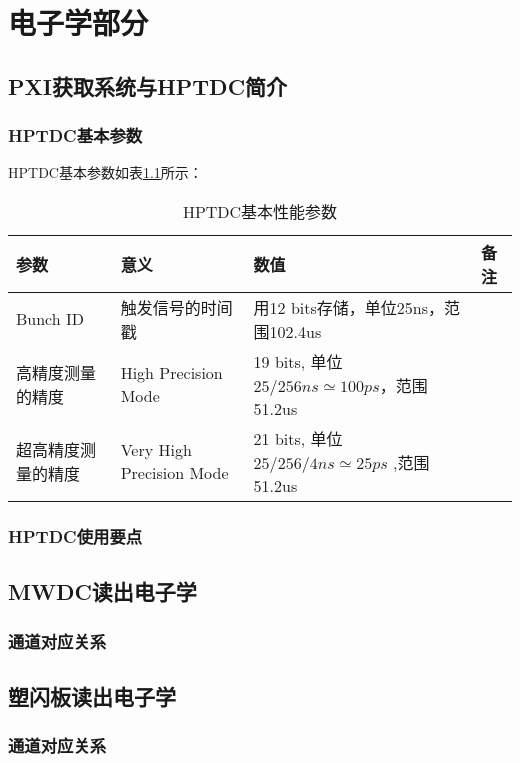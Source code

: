 \chapter{电子学部分}
\section{PXI获取系统与HPTDC简介}

\subsection{HPTDC基本参数}
HPTDC基本参数如表\ref{tbl:hptdc_parameters}所示：
\begin{table}
	\centering
		\begin{tabular}{|l|l|l|p{6cm}|}
			\hline
			参数 & 意义 & 数值 & 备注 \\ 
			\hline
			Bunch ID & 触发信号的时间戳 & 用12 bits存储，单位25ns，范围102.4us &  \\ 
			\hline
			高精度测量的精度 & High Precision Mode & 19 bits, 单位$25/256 ns\simeq 100 ps$，范围51.2us &  \\ 
			\hline
			超高精度测量的精度 & Very High Precision Mode & 21 bits, 单位$25/256/4 ns \simeq 25 ps$ ,范围51.2us & \\
			\hline
		\end{tabular}
		\caption{HPTDC基本性能参数}
		\label{tbl:hptdc_parameters}
\end{table}

\subsection{HPTDC使用要点}

\section{MWDC读出电子学}

\subsection{通道对应关系}

\section{塑闪板读出电子学}

\subsection{通道对应关系}

